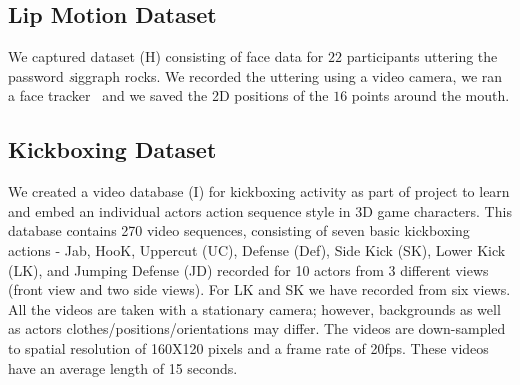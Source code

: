 \documentclass[jou,apacite]{apa6}
\begin{document}
\subsection{Lip Motion Dataset}
We captured dataset (H) consisting of face data for $22$ participants uttering the password {\emph siggraph rocks}. 
We recorded the uttering using a video camera, we ran a face tracker~\cite{saragih2009face} and we saved 
the 2D positions of the $16$ points around the mouth.

\subsection{Kickboxing Dataset}
We created a video database (I) for kickboxing activity as part of project to learn and embed an individual actor\textsc{}s action sequence style in 3D game characters. This database contains 270 video sequences, consisting of seven basic kickboxing actions - Jab, HooK, Uppercut (UC), Defense (Def), Side Kick (SK), Lower Kick (LK), and Jumping Defense (JD) recorded for 10 actors from 3 different views (front view and two side views). For LK and SK we have recorded from six views. All the videos are taken with a stationary camera; however, backgrounds as well as actors\textsc{} clothes/positions/orientations may differ. The videos are down-sampled to spatial resolution of 160X120 pixels and a frame rate of 20fps. These videos have an average length of 15 seconds.



%

\end{document}
